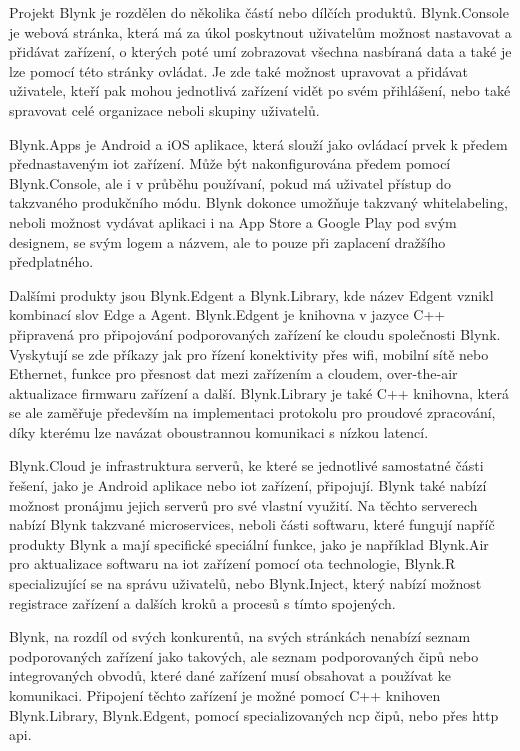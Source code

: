 Projekt Blynk je rozdělen do několika částí nebo dílčích produktů. Blynk.Console je webová stránka, která má za úkol poskytnout uživatelům možnost nastavovat a přidávat zařízení, o kterých poté umí zobrazovat všechna nasbíraná data a také je lze pomocí této stránky ovládat. Je zde také možnost upravovat a přidávat uživatele, kteří pak mohou jednotlivá zařízení vidět po svém přihlášení, nebo také spravovat celé organizace neboli skupiny uživatelů. 

Blynk.Apps je Android a iOS aplikace, která slouží jako ovládací prvek k předem přednastaveným \acrshort{iot} zařízení. Může být nakonfigurována předem pomocí Blynk.Console, ale i v průběhu používaní, pokud má uživatel přístup do takzvaného produkčního módu. Blynk dokonce umožňuje takzvaný whitelabeling, neboli možnost vydávat aplikaci i na App Store a Google Play pod svým designem, se svým logem a názvem, ale to pouze při zaplacení dražšího předplatného.

Dalšími produkty jsou Blynk.Edgent a Blynk.Library, kde název Edgent vznikl kombinací slov Edge a Agent. Blynk.Edgent je knihovna v jazyce C++ připravená pro připojování podporovaných zařízení ke cloudu společnosti Blynk. Vyskytují se zde příkazy jak pro řízení konektivity přes \acrshort{wifi}, mobilní sítě nebo Ethernet, funkce pro přesnost dat mezi zařízením a cloudem, over-the-air aktualizace firmwaru zařízení a další. Blynk.Library je také C++ knihovna, která se ale zaměřuje především na implementaci protokolu pro proudové zpracování, díky kterému lze navázat oboustrannou komunikaci s nízkou latencí. 

Blynk.Cloud je infrastruktura serverů, ke které se jednotlivé samostatné části řešení, jako je Android aplikace nebo \acrshort{iot} zařízení, připojují. Blynk také nabízí možnost pronájmu jejich serverů pro své vlastní využití. Na těchto serverech nabízí Blynk takzvané microservices, neboli části softwaru, které fungují napříč produkty Blynk a mají specifické speciální funkce, jako je například Blynk.Air pro aktualizace softwaru na \acrshort{iot} zařízení pomocí \acrshort{ota} technologie, Blynk.R specializující se na správu uživatelů, nebo Blynk.Inject, který nabízí možnost registrace zařízení a dalších kroků a procesů s tímto spojených.

Blynk, na rozdíl od svých konkurentů, na svých stránkách nenabízí seznam podporovaných zařízení jako takových, ale seznam podporovaných čipů nebo integrovaných obvodů, které dané zařízení musí obsahovat a používat ke komunikaci. Připojení těchto zařízení je možné pomocí C++ knihoven Blynk.Library, Blynk.Edgent, pomocí specializovaných \acrshort{ncp} čipů, nebo přes \acrshort{http} \acrshort{api}.


